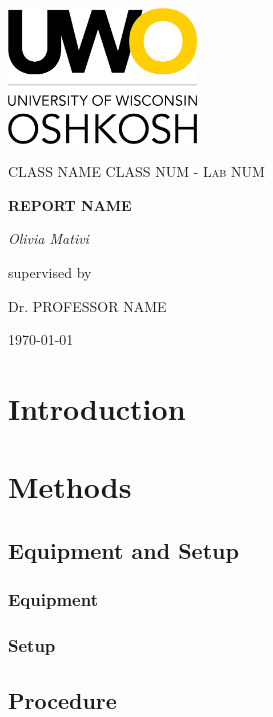 \documentclass{scrartcl}
\begin{document}
\begin{titlepage}
	\centering
	\includegraphics[width=5cm]{Graphics/UWO_vertical_Oshkosh_4c.png} \\
	\vspace{1cm}
	{\scshape\Large CLASS NAME CLASS NUM - Lab NUM\par}
	\vspace{1.5cm}
	{\huge\bfseries REPORT NAME\par}
	\vspace{2cm}
    \vspace{0.5cm}
    {\Large\itshape Olivia Mativi}\par
    \vspace{0.5cm}
	\vfill
    supervised by\par
	Dr. PROFESSOR NAME
	\vfill

	{\large \today\par}
\end{titlepage}
\clearpage
\tableofcontents
\clearpage

\section{Introduction} 

\section{Methods} 
    \subsection{Equipment and Setup} 
        \subsubsection{Equipment}
        \subsubsection{Setup}

\subsection{Procedure}
\end{document}
